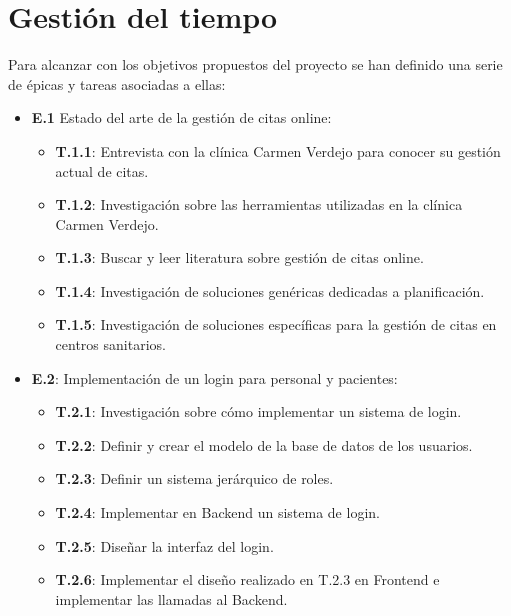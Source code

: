 \section{Gestión del tiempo} \label{gestion-tiempo}
Para alcanzar con los objetivos propuestos del proyecto se han definido una serie de épicas y tareas asociadas a ellas:
\begin{itemize}
    \item \textbf{E.1} Estado del arte de la gestión de citas online:
    \begin{itemize}
        \item \textbf{T.1.1}: Entrevista con la clínica Carmen Verdejo para conocer su gestión actual de citas.
        \item \textbf{T.1.2}: Investigación sobre las herramientas utilizadas en la clínica Carmen Verdejo.
        \item \textbf{T.1.3}: Buscar y leer literatura sobre gestión de citas online.
        \item \textbf{T.1.4}: Investigación de soluciones genéricas dedicadas a planificación.
        \item \textbf{T.1.5}: Investigación de soluciones específicas para la gestión de citas en centros sanitarios.
    \end{itemize}
    
    \item \textbf{E.2}: Implementación de un login para personal y pacientes:
    \begin{itemize}
        \item \textbf{T.2.1}: Investigación sobre cómo implementar un sistema de login.
        \item \textbf{T.2.2}: Definir y crear el modelo de la base de datos de los usuarios.
        \item \textbf{T.2.3}: Definir un sistema jerárquico de roles.
        \item \textbf{T.2.4}: Implementar en Backend un sistema de login.
        \item \textbf{T.2.5}: Diseñar la interfaz del login.
        \item \textbf{T.2.6}: Implementar el diseño realizado en T.2.3 en Frontend e implementar las llamadas al Backend.
    \end{itemize}
    

\end{itemize}

